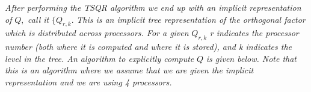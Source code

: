 \documentclass[11pt]{article}
\begin{document}
\begin{enumerate}
\textit{After performing the TSQR algorithm we end up with an implicit representation of } $Q,$ \textit{ call it } $\{Q_{r,k}$. \textit{This is an implicit tree representation of the orthogonal factor which is distributed across processors. For a given } $Q_{r, k}$ \textit{r indicates the processor number (both where it is computed and where it is stored), and k indicates the level in the tree. An algorithm to explicitly compute } $Q$ \textit{is given below. Note that this is an algorithm where we assume that we are given the implicit representation and we are using 4 processors.}



    
    
 

    
\end{enumerate}
\end{document}
